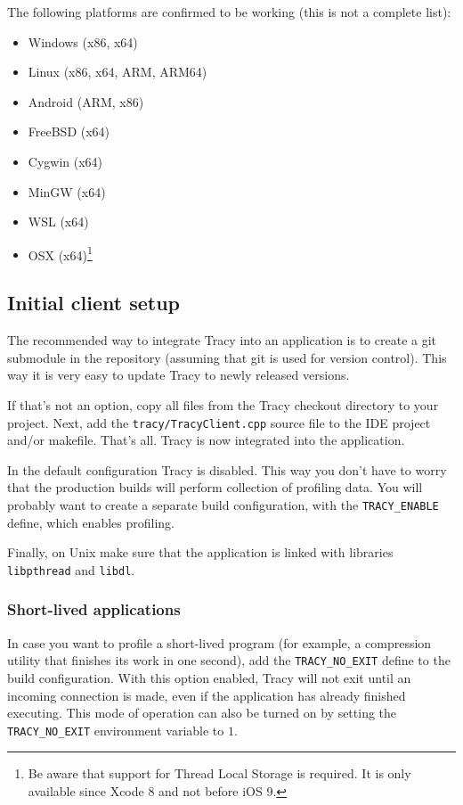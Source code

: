 \documentclass[hidelinks,titlepage,a4paper]{article}
\begin{document}
The following platforms are confirmed to be working (this is not a complete list):

\begin{itemize}
\item Windows (x86, x64)
\item Linux (x86, x64, ARM, ARM64)
\item Android (ARM, x86)
\item FreeBSD (x64)
\item Cygwin (x64)
\item MinGW (x64)
\item WSL (x64)
\item OSX (x64)\footnote{Be aware that support for Thread Local Storage is required. It is only available since Xcode 8 and not before iOS 9.}
\end{itemize}

\subsection{Initial client setup}

The recommended way to integrate Tracy into an application is to create a git submodule in the repository (assuming that git is used for version control). This way it is very easy to update Tracy to newly released versions.

If that's not an option, copy all files from the Tracy checkout directory to your project. Next, add the \texttt{tracy/TracyClient.cpp} source file to the IDE project and/or makefile. That's all. Tracy is now integrated into the application.

In the default configuration Tracy is disabled. This way you don't have to worry that the production builds will perform collection of profiling data. You will probably want to create a separate build configuration, with the \texttt{TRACY\_ENABLE} define, which enables profiling.

Finally, on Unix make sure that the application is linked with libraries \texttt{libpthread} and \texttt{libdl}.

\subsubsection{Short-lived applications}

In case you want to profile a short-lived program (for example, a compression utility that finishes its work in one second), add the \texttt{TRACY\_NO\_EXIT} define to the build configuration. With this option enabled, Tracy will not exit until an incoming connection is made, even if the application has already finished executing. This mode of operation can also be turned on by setting the \texttt{TRACY\_NO\_EXIT} environment variable to $1$.
\end{document}
